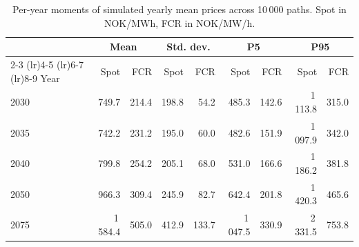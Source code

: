 \begin{table}[ht]
\centering
\caption{Per-year moments of simulated yearly mean prices across 10\,000 paths. Spot in NOK/MWh, FCR in NOK/MW/h.}
\label{tab:yearly-moments}
\begin{tabular}{lrrrrrrrr}
\toprule
 & \multicolumn{2}{c}{Mean} & \multicolumn{2}{c}{Std. dev.} & \multicolumn{2}{c}{P5} & \multicolumn{2}{c}{P95} \\
\cmidrule(lr){2-3} \cmidrule(lr){4-5} \cmidrule(lr){6-7} \cmidrule(lr){8-9}
Year & Spot & FCR & Spot & FCR & Spot & FCR & Spot & FCR \\
\midrule
  2030 & 749.7 & 214.4 & 198.8 & 54.2 & 485.3 & 142.6 & 1\,113.8 & 315.0 \\
  2035 & 742.2 & 231.2 & 195.0 & 60.0 & 482.6 & 151.9 & 1\,097.9 & 342.0 \\
  2040 & 799.8 & 254.2 & 205.1 & 68.0 & 531.0 & 166.6 & 1\,186.2 & 381.8 \\
  2050 & 966.3 & 309.4 & 245.9 & 82.7 & 642.4 & 201.8 & 1\,420.3 & 465.6 \\
  2075 & 1\,584.4 & 505.0 & 412.9 & 133.7 & 1\,047.5 & 330.9 & 2\,331.5 & 753.8 \\
\bottomrule
\end{tabular}
\end{table}
